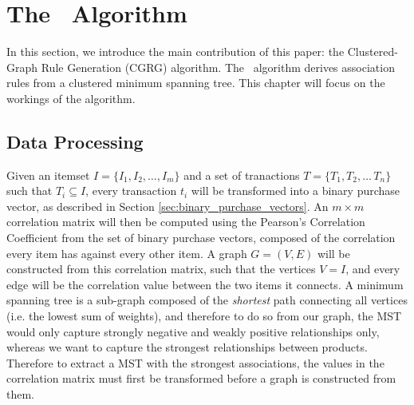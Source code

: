 
\chapter{The \algo\ Algorithm}
In this section, we introduce the main contribution of this paper: the Clustered-Graph Rule Generation (CGRG) algorithm. The \algo\ algorithm derives association rules from a clustered minimum spanning tree. This chapter will focus on the workings of the algorithm.

\section{Data Processing}
Given an itemset $I = \{I_1, I_2,\dots,I_m\}$ and a set of tranactions $T = \{T_1,T_2,\dots\,T_n\}$ such that $T_i \subseteq I$, every transaction $t_i$ will be transformed into a binary purchase vector, as described in Section \ref{sec:binary_purchase_vectors}. An $m \times m$ correlation matrix will then be computed using the Pearson's Correlation Coefficient from the set of binary purchase vectors, composed of the correlation every item has against every other item. A graph $G = (V,E)$ will be constructed from this correlation matrix, such that the vertices $V=I$, and every edge will be the correlation value between the two items it connects. A minimum spanning tree is a sub-graph composed of the \textit{shortest} path connecting all vertices (i.e. the lowest sum of weights), and therefore to do so from our graph, the MST would only capture strongly negative and weakly positive relationships only, whereas we want to capture the strongest relationships between products. Therefore to extract a MST with the strongest associations, the values in the correlation matrix must first be transformed before a graph is constructed from them.


